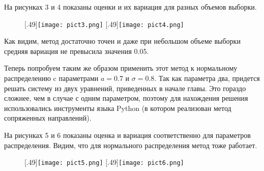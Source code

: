     На рисунках 3 и 4 показаны оценки и их вариация для разных объемов выборки.
    \begin{figure}[H]
        [.49\linewidth]{\texttt{[image: pict3.png]}}
        \hfill
        [.49\linewidth]{\texttt{[image: pict4.png]}}
    \end{figure}
    Как видим, метод достаточно точен и даже при небольшом объеме выборки средняя вариация не превысила значения 0.05.

    Теперь попробуем таким же образом применить этот метод к нормальному распределению c параметрами $a = 0.7$ и $\sigma = 0.8$. 
    Так как параметра два, придется решать систему из двух уравнений, приведенных в начале главы. Это гораздо сложнее, чем в случае с одним параметром, поэтому для нахождения решения использовались инструменты языка Python (в котором реализован метод сопряженных направлений).

    На рисунках 5 и 6 показаны оценка и вариация соответственно для параметров распределения. Видим, что для нормального распределения метод тоже работает.
    \begin{figure}[H]
        [.49\linewidth]{\texttt{[image: pict5.png]}}
        \hfill
        [.49\linewidth]{\texttt{[image: pict6.png]}}
    \end{figure}